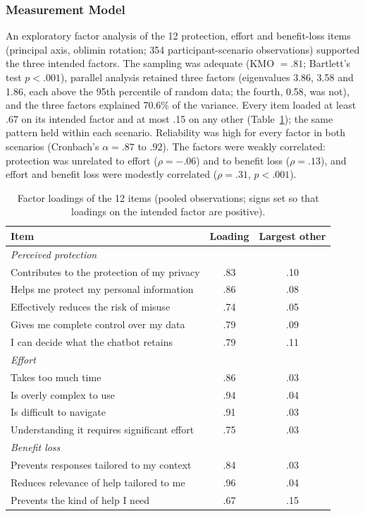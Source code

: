 \documentclass[conference,compsoc]{IEEEtran}
\begin{document}
\subsubsection{Measurement Model}

An exploratory factor analysis of the 12 protection, effort and benefit-loss items (principal axis, oblimin rotation; 354 participant-scenario observations) supported the three intended factors. The sampling was adequate (KMO $=.81$; Bartlett's test $p<.001$), parallel analysis retained three factors (eigenvalues 3.86, 3.58 and 1.86, each above the 95th percentile of random data; the fourth, 0.58, was not), and the three factors explained 70.6\% of the variance. Every item loaded at least .67 on its intended factor and at most .15 on any other (Table~\ref{tab:efa}); the same pattern held within each scenario. Reliability was high for every factor in both scenarios (Cronbach's $\alpha=.87$ to $.92$). The factors were weakly correlated: protection was unrelated to effort ($\rho=-.06$) and to benefit loss ($\rho=.13$), and effort and benefit loss were modestly correlated ($\rho=.31$, $p<.001$).

\begin{table}[t]
\centering
\caption{Factor loadings of the 12 items (pooled observations; signs set so that loadings on the intended factor are positive).}
\label{tab:efa}
\small
\setlength{\tabcolsep}{3pt}
\begin{tabular}{p{}cc}
\toprule
Item & Loading & Largest other \\
\midrule
\multicolumn{3}{l}{\textit{Perceived protection}} \\
Contributes to the protection of my privacy & .83 & .10 \\
Helps me protect my personal information & .86 & .08 \\
Effectively reduces the risk of misuse & .74 & .05 \\
Gives me complete control over my data & .79 & .09 \\
I can decide what the chatbot retains & .79 & .11 \\
\midrule
\multicolumn{3}{l}{\textit{Effort}} \\
Takes too much time & .86 & .03 \\
Is overly complex to use & .94 & .04 \\
Is difficult to navigate & .91 & .03 \\
Understanding it requires significant effort & .75 & .03 \\
\midrule
\multicolumn{3}{l}{\textit{Benefit loss}} \\
Prevents responses tailored to my context & .84 & .03 \\
Reduces relevance of help tailored to me & .96 & .04 \\
Prevents the kind of help I need & .67 & .15 \\
\bottomrule
\end{tabular}
\end{table}
\end{document}
